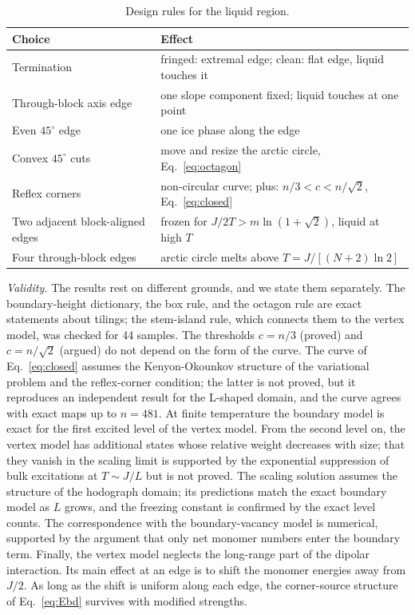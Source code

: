 \documentclass[reprint,aps,prb,floatfix,longbibliography,amsmath,amssymb]{revtex4-2}
\begin{document}
\begin{table}[t]
\caption{\label{tab:rules}Design rules for the liquid region.}
\begin{ruledtabular}
\begin{tabular}{p{}p{}}
Choice & Effect \\
\hline
Termination & fringed: extremal edge; clean: flat edge, liquid touches it \\
Through-block axis edge & one slope component fixed; liquid touches at one point \\
Even $45^\circ$ edge & one ice phase along the edge \\
Convex $45^\circ$ cuts & move and resize the arctic circle, Eq.~\eqref{eq:octagon} \\
Reflex corners & non-circular curve; plus: $n/3<c<n/\sqrt2$, Eq.~\eqref{eq:closed} \\
Two adjacent block-aligned edges & frozen for $J/2T>m\ln(1+\sqrt2)$, liquid at high $T$ \\
Four through-block edges & arctic circle melts above $T=J/[(N+2)\ln2]$ \\
\end{tabular}
\end{ruledtabular}
\end{table}

\emph{Validity.} The results rest on different grounds, and we state them separately. The boundary-height dictionary, the box rule, and the octagon rule are exact statements about tilings; the stem-island rule, which connects them to the vertex model, was checked for 44 samples. The thresholds $c=n/3$ (proved) and $c=n/\sqrt2$ (argued) do not depend on the form of the curve. The curve of Eq.~\eqref{eq:closed} assumes the Kenyon-Okounkov structure of the variational problem and the reflex-corner condition; the latter is not proved, but it reproduces an independent result for the L-shaped domain, and the curve agrees with exact maps up to $n=481$. At finite temperature the boundary model is exact for the first excited level of the vertex model. From the second level on, the vertex model has additional states whose relative weight decreases with size; that they vanish in the scaling limit is supported by the exponential suppression of bulk excitations at $T\sim J/L$ but is not proved. The scaling solution assumes the structure of the hodograph domain; its predictions match the exact boundary model as $L$ grows, and the freezing constant is confirmed by the exact level counts. The correspondence with the boundary-vacancy model is numerical, supported by the argument that only net monomer numbers enter the boundary term. Finally, the vertex model neglects the long-range part of the dipolar interaction. Its main effect at an edge is to shift the monomer energies away from $J/2$. As long as the shift is uniform along each edge, the corner-source structure of Eq.~\eqref{eq:Ebd} survives with modified strengths.
\end{document}
